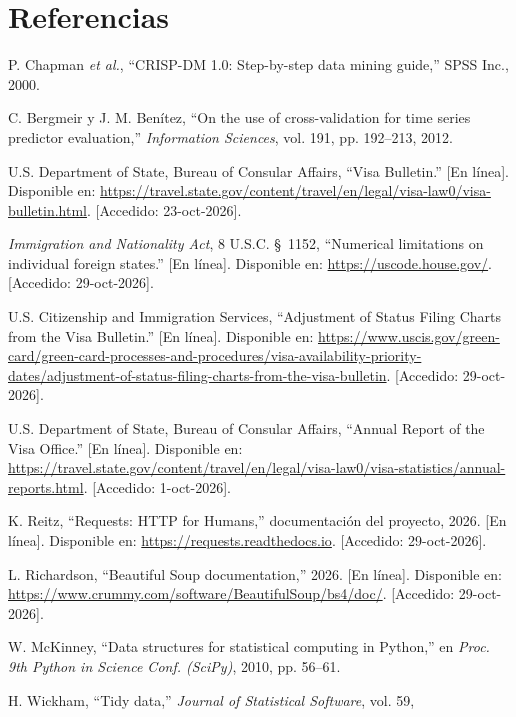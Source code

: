 \documentclass[12pt,letterpaper]{report}
\begin{document}
\chapter{Referencias}
{\small
\begin{enumerate}[label={[\arabic*]}, leftmargin=*, itemsep=0pt, parsep=0pt, topsep=0pt]
\item\label{bib:1} P. Chapman \textit{et al.}, ``CRISP-DM 1.0: Step-by-step data
mining guide,'' SPSS Inc., 2000.
\item\label{bib:2} C. Bergmeir y J. M. Benítez, ``On the use of cross-validation for time series predictor evaluation,'' \textit{Information Sciences}, vol. 191, pp. 192--213, 2012.
\item\label{bib:3} U.S. Department of State, Bureau of Consular Affairs, ``Visa Bulletin.'' [En línea].
Disponible en: \url{https://travel.state.gov/content/travel/en/legal/visa-law0/visa-bulletin.html}. [Accedido: 23-oct-2026].
\item\label{bib:4} \textit{Immigration and Nationality Act}, 8 U.S.C. \S~1152, ``Numerical limitations on
individual foreign states.'' [En línea]. Disponible en: \url{https://uscode.house.gov/}. [Accedido: 29-oct-2026].
\item\label{bib:5} U.S. Citizenship and Immigration Services, ``Adjustment of Status Filing Charts from
the Visa Bulletin.'' [En línea]. Disponible en:
\url{https://www.uscis.gov/green-card/green-card-processes-and-procedures/visa-availability-priority-dates/adjustment-of-status-filing-charts-from-the-visa-bulletin}. [Accedido: 29-oct-2026].
\item\label{bib:6} U.S. Department of State, Bureau of Consular Affairs, ``Annual Report of the Visa
Office.'' [En línea]. Disponible en:
\url{https://travel.state.gov/content/travel/en/legal/visa-law0/visa-statistics/annual-reports.html}. [Accedido: 1-oct-2026].
\item\label{bib:7} K. Reitz, ``Requests: HTTP for Humans,'' documentación del proyecto, 2026. [En línea].
Disponible en: \url{https://requests.readthedocs.io}. [Accedido: 29-oct-2026].
\item\label{bib:8} L. Richardson, ``Beautiful Soup documentation,'' 2026. [En línea]. Disponible en:
\url{https://www.crummy.com/software/BeautifulSoup/bs4/doc/}. [Accedido: 29-oct-2026].
\item\label{bib:9} W. McKinney, ``Data structures for statistical computing in Python,'' en
\textit{Proc. 9th Python in Science Conf. (SciPy)}, 2010, pp. 56--61.
\item\label{bib:10} H. Wickham, ``Tidy data,'' \textit{Journal of Statistical Software}, vol. 59,

\end{enumerate}}
\end{document}
